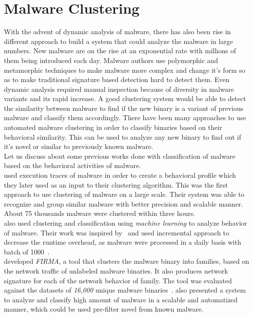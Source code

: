\section{Malware Clustering}
\label{sec:Malware Clustering}
With the advent of dynamic analysis of malware, there has also been rise in different approach to build a system that could analyze the malware in large numbers.
New malware are on the rise at an exponential rate with millions of them being introduced each day.
Malware authors use polymorphic and metamorphic techniques to make malware more complex and change it's form so as to make traditional signature based detection hard to detect them.
Even dynamic analysis required manual inspection because of diversity in malware variants and its rapid increase.
A good clustering system would be able to detect the similarity between malware to find if the new binary is a variant of previous malware and classify them accordingly.
There have been many approaches to use automated malware clustering in order to classify binaries based on their behavioral similarity.
This can be used to analyze any new binary to find out if it's novel or similar to previously known malware.\\
Let us discuss about some previous works done with classification of malware based on the behavioral activities of malware.\\
\citeauthor{bayer} used execution traces of malware in order to create a behavioral profile which they later used as an input to their clustering algorithm.
This was the first approach to use clustering of malware on a large scale.
Their system was able to recognize and group similar malware with better precision and scalable manner.
About 75 thousands malware were clustered within three hours.\\
\citeauthor{autoana} also used clustering and classification using \emph{machine learning} to analyze behavior of malware.
Their work was inspired by~\cite[]{bayer} and used incremental approach to decrease the runtime overhead, as malware were processed in a daily basis with batch of 1000~\cite[]{autoana}.\\
\citeauthor{firma} developed \emph{FIRMA}, a tool that clusters the malware binary into families, based on the network traffic of unlabeled malware binaries.
It also produces network signature for each of the network behavior of family.
The tool was evaluated against the datasets of \emph{16,000} unique malware binaries~\cite[]{firma}.
\citeauthor{pirscoveanu} also presented a system to analyze and classify high amount of malware in a scalable and automatized manner, which could be used pre-filter novel from known malware.
